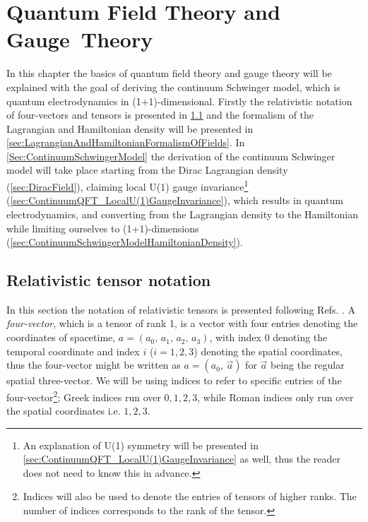 \documentclass[../main.tex]{subfiles} %
\begin{document}
\chapter{Quantum Field Theory and Gauge~Theory} \label{chap:ContinuumQFT}


In this chapter the basics of quantum field theory and gauge theory will be explained with the goal of deriving the continuum Schwinger model, which is quantum electrodynamics in (1+1)-dimensional. Firstly the relativistic notation of four-vectors and tensors is presented in \cref{sec:RelativisticTensorNotation} and the formalism of the Lagrangian and Hamiltonian density will be presented in \cref{sec:LagrangianAndHamiltonianFormalismOfFields}. In \cref{Sec:ContinuumSchwingerModel} the derivation of the continuum Schwinger model will take place starting from the Dirac Lagrangian density (\cref{sec:DiracField}), claiming local U(1) gauge invariance\footnote{An explanation of U(1) symmetry will be presented in \cref{sec:ContinuumQFT_LocalU(1)GaugeInvariance} as well, thus the reader does not need to know this in advance.} (\cref{sec:ContinuumQFT_LocalU(1)GaugeInvariance}), which results in quantum electrodynamics, and converting from the Lagrangian density to the Hamiltonian while limiting ourselves to (1+1)-dimensions (\cref{sec:ContinuumSchwingerModelHamiltonianDensity}).




\section{Relativistic tensor notation} \label{sec:RelativisticTensorNotation}

In this section the notation of relativistic tensors is presented following Refs. \cite{peskin_introToQFT_1995,Uggerhoej_SpecielRelativitetsteori_2016}. A \emph{four-vector}, which is a tensor of rank 1, is a vector with four entries denoting the coordinates of spacetime, $a = (a_0,\, a_1,\, a_2,\, a_3)$, with index $0$ denoting the temporal coordinate and index $i$ ($i = 1,2,3$) denoting the spatial coordinates, thus the four-vector might be written as $a = (a_0,\, \Vec{a})$ for $\Vec{a}$ being the regular spatial three-vector. We will be using indices to refer to specific entries of the four-vector\footnote{Indices will also be used to denote the entries of tensors of higher ranks. The number of indices corresponds to the rank of the tensor.}; Greek indices run over $0,1,2,3$, while Roman indices only run over the spatial coordinates i.e. $1,2,3$.
\end{document}
